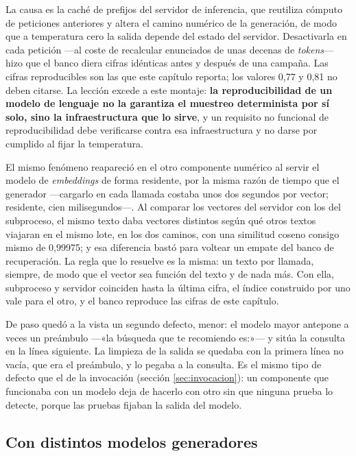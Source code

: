 La causa es la caché de prefijos del servidor de inferencia, que reutiliza cómputo de peticiones
anteriores y altera el camino numérico de la generación, de modo que a temperatura cero la salida
depende del estado del servidor. Desactivarla en cada petición ---al coste de recalcular
enunciados de unas decenas de \emph{tokens}--- hizo que el banco diera cifras idénticas antes y
después de una campaña. Las cifras reproducibles son las que este capítulo reporta; los valores
0,77 y 0,81 no deben citarse. La lección excede a este montaje: \textbf{la reproducibilidad de un
modelo de lenguaje no la garantiza el muestreo determinista por sí solo, sino la infraestructura
que lo sirve}, y un requisito no funcional de reproducibilidad debe verificarse contra esa
infraestructura y no darse por cumplido al fijar la temperatura.

El mismo fenómeno reapareció en el otro componente numérico al servir el modelo de
\emph{embeddings} de forma residente, por la misma razón de tiempo que el generador ---cargarlo en
cada llamada costaba unos dos segundos por vector; residente, cien milisegundos---. Al comparar
los vectores del servidor con los del subproceso, el mismo texto daba vectores distintos según
qué otros textos viajaran en el mismo lote, en los dos caminos, con una similitud coseno consigo
mismo de 0,99975; y esa diferencia bastó para voltear un empate del banco de recuperación. La
regla que lo resuelve es la misma: un texto por llamada, siempre, de modo que el vector sea
función del texto y de nada más. Con ella, subproceso y servidor coinciden hasta la última cifra,
el índice construido por uno vale para el otro, y el banco reproduce las cifras de este capítulo.

De paso quedó a la vista un segundo defecto, menor: el modelo mayor antepone a veces un preámbulo
---«la búsqueda que te recomiendo es:»--- y sitúa la consulta en la línea siguiente. La limpieza de
la salida se quedaba con la primera línea no vacía, que era el preámbulo, y lo pegaba a la
consulta. Es el mismo tipo de defecto que el de la invocación (sección \ref{sec:invocacion}): un
componente que funcionaba con un modelo deja de hacerlo con otro sin que ninguna prueba lo
detecte, porque las pruebas fijaban la salida del modelo.

\subsection{Con distintos modelos generadores}
\label{sec:rag-modelos}

